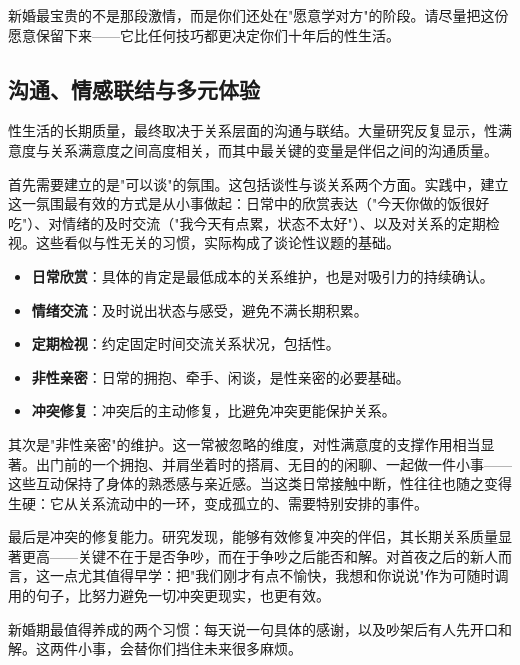 \documentclass[12pt,UTF8]{ctexbook}
\newcommand{\keyword}[1]{\textbf{#1}}
\begin{document}
\begin{tcolorbox}[colback=pink!5!white,colframe=red!50!black,title=贴心小叮咛]
	新婚最宝贵的不是那段激情，而是你们还处在"愿意学对方"的阶段。请尽量把这份愿意保留下来——它比任何技巧都更决定你们十年后的性生活。
\end{tcolorbox}
\subsection{沟通、情感联结与多元体验}

性生活的长期质量，最终取决于关系层面的沟通与联结。大量研究反复显示，性满意度与关系满意度之间高度相关，而其中最关键的变量是伴侣之间的沟通质量。

首先需要建立的是"可以谈"的氛围。这包括谈性与谈关系两个方面。实践中，建立这一氛围最有效的方式是从小事做起：日常中的欣赏表达（"今天你做的饭很好吃"）、对情绪的及时交流（"我今天有点累，状态不太好"）、以及对关系的定期检视。这些看似与性无关的习惯，实际构成了谈论性议题的基础。

\begin{itemize}
	\item \keyword{日常欣赏}：具体的肯定是最低成本的关系维护，也是对吸引力的持续确认。
	\item \keyword{情绪交流}：及时说出状态与感受，避免不满长期积累。
	\item \keyword{定期检视}：约定固定时间交流关系状况，包括性。
	\item \keyword{非性亲密}：日常的拥抱、牵手、闲谈，是性亲密的必要基础。
	\item \keyword{冲突修复}：冲突后的主动修复，比避免冲突更能保护关系。
\end{itemize}

其次是"非性亲密"的维护。这一常被忽略的维度，对性满意度的支撑作用相当显著。出门前的一个拥抱、并肩坐着时的搭肩、无目的的闲聊、一起做一件小事——这些互动保持了身体的熟悉感与亲近感。当这类日常接触中断，性往往也随之变得生硬：它从关系流动中的一环，变成孤立的、需要特别安排的事件。

最后是冲突的修复能力。研究发现，能够有效修复冲突的伴侣，其长期关系质量显著更高——关键不在于是否争吵，而在于争吵之后能否和解。对首夜之后的新人而言，这一点尤其值得早学：把"我们刚才有点不愉快，我想和你说说"作为可随时调用的句子，比努力避免一切冲突更现实，也更有效。

\begin{tcolorbox}[colback=pink!5!white,colframe=red!50!black,title=贴心小叮咛]
	新婚期最值得养成的两个习惯：每天说一句具体的感谢，以及吵架后有人先开口和解。这两件小事，会替你们挡住未来很多麻烦。
\end{tcolorbox}
\end{document}

